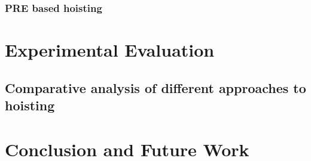 \documentclass{sig-alternate}
\begin{document}
\subsubsection{PRE based hoisting}

\newpage

\section{Experimental Evaluation}
\label{sec:experimental-results}

\subsection{Comparative analysis of different approaches to hoisting}


\section{Conclusion and Future Work}


{\small

}
\end{document}
